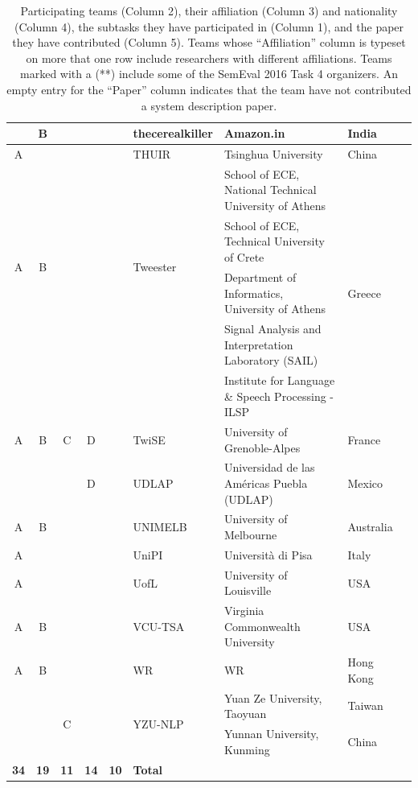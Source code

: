 \documentclass[11pt,letterpaper]{article}
\begin{document}
\begin{table}[htb]
\begin{center}
{\begin{tabular}{|ccccc|l|l|l|l|}
      & B & & & & thecerealkiller & Amazon.in & India & \cite{SemEval:2016:task4:thecerealkiller} \\ \hline 
      A & & & & & THUIR & Tsinghua University & China &  \\ \hline 
      \multirow{4}{*}{A} & \multirow{4}{*}{B} & & & & \multirow{4}{*}{Tweester} & School of ECE, National Technical University of Athens & \multirow{5}{*}{Greece} & \multirow{5}{*}{\cite{SemEval:2016:task4:Tweester}} \\ 
      & & & & & & School of ECE, Technical University of Crete & & \\ 
      & & & & & & Department of Informatics, University of Athens & &  \\ 
      & & & & & & Signal Analysis and Interpretation Laboratory (SAIL) & &  \\ 
      & & & & & & Institute for Language \& Speech Processing - ILSP & &  \\ \hline 
      A & B & C & D & & TwiSE & University of Grenoble-Alpes & France & \cite{SemEval:2016:task4:TwiSE} \\ \hline 
      & & & D & & UDLAP & Universidad de las Américas Puebla (UDLAP) & Mexico & \cite{SemEval:2016:task4:UDLAP} \\ \hline 
      A & B & & & & UNIMELB & University of Melbourne & Australia & \cite{SemEval:2016:task4:UNIMELB} \\ \hline 
      A & & & & & UniPI & Università di Pisa & Italy & \cite{SemEval:2016:task4:UniPI} \\ \hline 
      A & & & & & UofL & University of Louisville & USA & \cite{SemEval:2016:task4:UofL} \\ \hline 
      A & B & & & & VCU-TSA & Virginia Commonwealth University & USA & \cite{SemEval:2016:task4:VCU-TSA} \\ \hline 
      A & B & & & & WR & WR & Hong Kong %
      &  \\ \hline 
      & & \multirow{2}{*}{C} & & & \multirow{2}{*}{YZU-NLP} & Yuan Ze University, Taoyuan & Taiwan & \multirow{2}{*}{\cite{SemEval:2016:task4:YZU-NLP}} \\
      & & & & & & Yunnan University, Kunming & China &  \\ \hline 
      \hline\rule[0ex]{0mm}{2ex} 
      \textbf{34} & \textbf{19} & \textbf{11} & \textbf{14} & \textbf{10} & \textbf{Total} & & & \\ \hline
    \end{tabular}
    }
  \end{center}
  \caption{Participating teams (Column 2), their affiliation (Column 3) and nationality (Column 4), the subtasks they have participated in (Column 1), and the paper they have contributed (Column 5). Teams whose ``Affiliation'' column is typeset on more that one row include researchers with different affiliations. Teams marked with a (**) include some of the SemEval 2016 Task 4 organizers. An empty entry for the ``Paper'' column indicates that the team have not contributed a system description paper. \label{tab:participants}}
\end{table}
\end{document}
